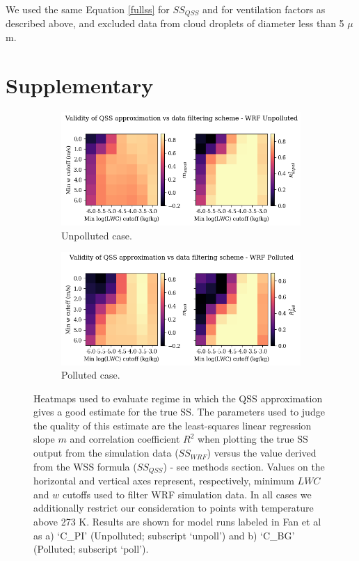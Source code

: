 \documentclass{article}
\begin{document}
We used the same Equation \ref{fullss} for $SS_{QSS}$ and for ventilation factors as described above, and excluded data from cloud droplets of diameter less than 5 $\mu$m.

\clearpage
\newpage

\section{Supplementary}

\begin{figure}[ht]
	\centering
	\begin{subfigure}{1\textwidth}
		\includegraphics[width=\textwidth]{revmywrf/v1_FINAL_from_data_regres_param_heatmaps_Unpolluted_figure.png}
		\caption{Unpolluted case.}
		\label{regresheatmapunpoll}
	\end{subfigure}
	\begin{subfigure}{1\textwidth}
		\includegraphics[width=\textwidth]{revmywrf/v1_FINAL_from_data_regres_param_heatmaps_Polluted_figure.png}
		\caption{Polluted case.}
		\label{regresheatmappoll}
	\end{subfigure}
	\caption{Heatmaps used to evaluate regime in which the QSS approximation gives a good estimate for the true SS. The parameters used to judge the quality of this estimate are the least-squares linear regression slope $m$ and correlation coefficient $R^2$ when plotting the true SS output from the simulation data ($SS_{WRF}$) versus the value derived from the WSS formula ($SS_{QSS}$) - see methods section. Values on the horizontal and vertical axes represent, respectively, minimum $LWC$ and $w$ cutoffs used to filter WRF simulation data. In all cases we additionally restrict our consideration to points with temperature above 273 K. Results are shown for model runs labeled in Fan et al as a) `C\_PI' (Unpolluted; subscript `unpoll') and b) `C\_BG' (Polluted; subscript `poll').}
	\label{regresheatmap}
\end{figure}
\end{document}
